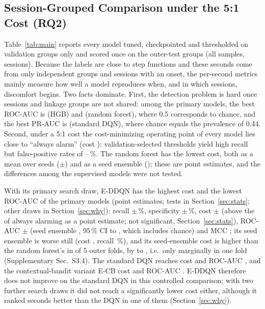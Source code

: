 \subsection{Session-Grouped Comparison under the 5:1 Cost (RQ2)}
\label{sec:main}
Table~\ref{tab:main} reports every model tuned, checkpointed and thresholded on validation groups only and scored once on the outer-test groups (all \nSamplesEval{} samples, \nSessionsEval{} sessions). Because the labels are close to step functions and these seconds come from only \nGroupsEval{} independent groups and \nEventSessions{} sessions with an onset, the per-second metrics mainly measure how well a model reproduces when, and in which sessions, discomfort begins. Two facts dominate. First, the detection problem is hard once sessions and linkage groups are not shared: among the primary models, the best ROC-AUC is \HGBCostRocAucMean{} (HGB) and \RFCostRocAucMean{} (random forest), where 0.5 corresponds to chance, and the best PR-AUC is \DQNCostPrAucMean{} (standard DQN), where chance equals the prevalence of 0.44. Second, under a 5:1 cost the cost-minimizing operating point of every model lies close to ``always alarm'' (cost \AlwaysCost): validation-selected thresholds yield high recall but false-positive rates of \DOneFPRMin--\DOneFPRMax\,\%. The random forest has the lowest cost, both as a mean over seeds (\RFCostCostMean$\pm$\RFCostCostSD) and as a seed ensemble (\PHEnsRFCost); these are point estimates, and the differences among the supervised models were not tested.

With its primary search draw, E-DDQN has the highest cost and the lowest ROC-AUC of the \nModels{} primary models (point estimates; tests in Section~\ref{sec:stats}; other draws in Section~\ref{sec:why}): recall \EDDQNCostRecallMean$\pm$\EDDQNCostRecallSD\,\%, specificity \EDDQNCostSpecMean$\pm$\EDDQNCostSpecSD\,\%, cost \EDDQNCostCostMean$\pm$\EDDQNCostCostSD{} (above the \AlwaysCost{} of always alarming as a point estimate; not significant, Section~\ref{sec:stats}), ROC-AUC \EDDQNCostRocAucMean$\pm$\EDDQNCostRocAucSD{} (seed ensemble \EDDQNCostRocAucEns, 95\,\% CI \EDDQNCIRocAucLo{} to \EDDQNCIRocAucHi, which includes chance) and MCC \EDDQNCostMCCMean; its seed ensemble is worse still (cost \PHEnsEDDQNCost, recall \PHEnsEDDQNRecall\,\%), and its seed-ensemble cost is higher than the random forest's in \PHFoldsEDDQNWorseRF{} of 5 outer folds, by \PHFoldDiffEDDQNRFMin{} to \PHFoldDiffEDDQNRFMax{}, i.e.\ only marginally in one fold (Supplementary Sec.~S3.4). The standard DQN reaches cost \DQNCostCostMean{} and ROC-AUC \DQNCostRocAucMean, and the contextual-bandit variant E-CB cost \ECBCostCostMean{} and ROC-AUC \ECBCostRocAucMean. E-DDQN therefore does not improve on the standard DQN in this controlled comparison; with two further search draws it did not reach a significantly lower cost either, although it ranked seconds better than the DQN in one of them (Section~\ref{sec:why}).

